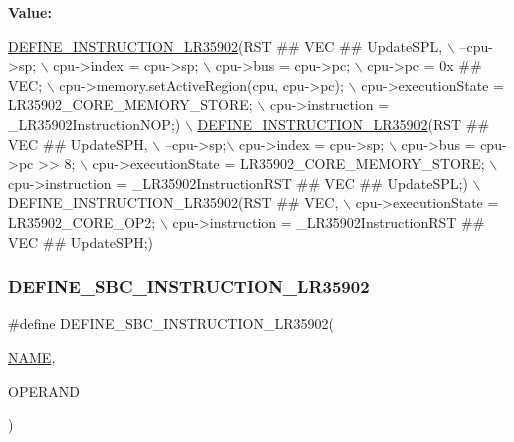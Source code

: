 {\bfseries Value\+:}
\begin{DoxyCode}
\mbox{\hyperlink{isa-lr35902_8c_a3128fc43c5d01e8b51f67901c0b4b5ef}{DEFINE\_INSTRUCTION\_LR35902}}(RST ## VEC ## UpdateSPL, \(\backslash\)
        --cpu->sp; \(\backslash\)
        cpu->index = cpu->sp; \(\backslash\)
        cpu->bus = cpu->pc; \(\backslash\)
        cpu->pc = 0x ## VEC; \(\backslash\)
        cpu->memory.setActiveRegion(cpu, cpu->pc); \(\backslash\)
        cpu->executionState = LR35902\_CORE\_MEMORY\_STORE; \(\backslash\)
        cpu->instruction = \_LR35902InstructionNOP;) \(\backslash\)
    \mbox{\hyperlink{isa-lr35902_8c_a3128fc43c5d01e8b51f67901c0b4b5ef}{DEFINE\_INSTRUCTION\_LR35902}}(RST ## VEC ## UpdateSPH, \(\backslash\)
        --cpu->sp;\(\backslash\)
        cpu->index = cpu->sp; \(\backslash\)
        cpu->bus = cpu->pc >> 8; \(\backslash\)
        cpu->executionState = LR35902\_CORE\_MEMORY\_STORE; \(\backslash\)
        cpu->instruction = \_LR35902InstructionRST ## VEC ## UpdateSPL;) \(\backslash\)
    DEFINE\_INSTRUCTION\_LR35902(RST ## VEC, \(\backslash\)
        cpu->executionState = LR35902\_CORE\_OP2; \(\backslash\)
        cpu->instruction = \_LR35902InstructionRST ## VEC ## UpdateSPH;)
\end{DoxyCode}
\mbox{\label{isa-lr35902_8c_a52e05380a0a3e6cce189cd87bcc19b55}} 
\subsubsection{\texorpdfstring{D\+E\+F\+I\+N\+E\+\_\+\+S\+B\+C\+\_\+\+I\+N\+S\+T\+R\+U\+C\+T\+I\+O\+N\+\_\+\+L\+R35902}{DEFINE\_SBC\_INSTRUCTION\_LR35902}}
{\footnotesize\ttfamily \#define D\+E\+F\+I\+N\+E\+\_\+\+S\+B\+C\+\_\+\+I\+N\+S\+T\+R\+U\+C\+T\+I\+O\+N\+\_\+\+L\+R35902(\begin{DoxyParamCaption}\item[{}]{\mbox{\hyperlink{inflate_8h_a164ea0159d5f0b5f12a646f25f99eceaa67bc2ced260a8e43805d2480a785d312}{N\+A\+ME}},  }\item[{}]{O\+P\+E\+R\+A\+ND }\end{DoxyParamCaption})}

